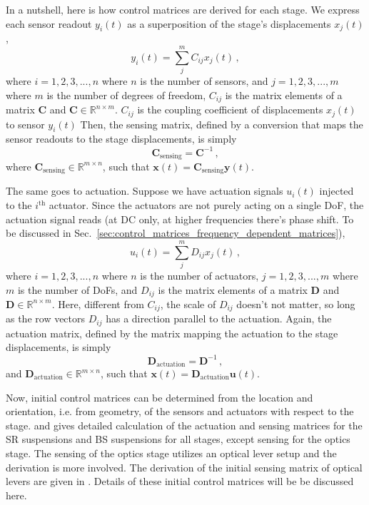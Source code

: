 In a nutshell, here is how control matrices are derived for each stage.
We express each sensor readout $y_i(t)$ as a superposition of the stage's displacements $x_j(t)$,
\begin{equation}
	y_i(t) = \sum_j^m C_{ij} x_j(t)\,,
\end{equation}
where $i=1,2,3,...,n$ where $n$ is the number of sensors, and $j=1,2,3,...,m$ where $m$ is the number of degrees of freedom, $C_{ij}$ is the matrix elements of a matrix $\mathbf{C}$ and $\mathbf{C}\in \mathbb{R}^{n\times m}$.
$C_{ij}$ is the coupling coefficient of displacements $x_j(t)$ to sensor  $y_i(t)$
Then, the sensing matrix, defined by a conversion that maps the sensor readouts to the stage displacements, is simply
\begin{equation}
	\mathbf{C}_{\mathrm{sensing}} = \mathbf{C}^{-1}\,,
\end{equation}
where $\mathbf{C}_\mathrm{sensing} \in \mathbb{R}^{m\times n}$, such that $\mathbf{x}(t) = \mathbf{C}_\mathrm{sensing}\mathbf{y}(t)$.

The same goes to actuation.
Suppose we have actuation signals $u_i(t)$ injected to the $i^\mathrm{th}$ actuator.
Since the actuators are not purely acting on a single DoF, the actuation signal reads (at DC only, at higher frequencies there's phase shift. To be discussed in Sec.~\ref{sec:control_matrices_frequency_dependent_matrices}),
\begin{equation}
	u_i(t) = \sum_j^m D_{ij} x_j(t)\,,
\end{equation}
where $i=1,2,3,...,n$ where $n$ is the number of actuators, $j=1,2,3,...,m$ where $m$ is the number of DoFs, and $D_{ij}$ is the matrix elements of a matrix $\mathbf{D}$ and $\mathbf{D}\in \mathbb{R}^{n\times m}$.
Here, different from $C_{ij}$, the scale of $D_{ij}$ doesn't not matter, so long as the row vectors $D_{ij}$ has a direction parallel to the actuation.
Again, the actuation matrix, defined by the matrix mapping the actuation to the stage displacements, is simply
\begin{equation}
	\mathbf{D}_\mathrm{actuation} = \mathbf{D}^{-1}\,,
\end{equation}
and $\mathbf{D}_\mathrm{actuation}\in\mathbb{R}^{m\times n}$, such that $\mathbf{x}(t) = \mathbf{D}_\mathrm{actuation}\mathbf{u}(t)$.

Now, initial control matrices can be determined from the location and orientation, i.e. from geometry, of the sensors and actuators with respect to the stage.
\cite{sr_suspension_diagonalization} and \cite{bs_suspension_diagonalization} gives detailed calculation of the actuation and sensing matrices for the SR suspensions and BS suspensions for all stages, except sensing for the optics stage.
The sensing of the optics stage utilizes an optical lever setup and the derivation is more involved.
The derivation of the initial sensing matrix of optical levers are given in \cite{sensing_matrices_oplev}.
Details of these initial control matrices will be be discussed here.

